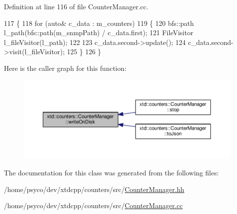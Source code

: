 Definition at line 116 of file Counter\+Manager.\+cc.


\begin{DoxyCode}
117 \{
118   \textcolor{keywordflow}{for} (\textcolor{keyword}{auto}& c\_data : m\_counters)
119   \{
120     bfs::path   l\_path(bfs::path(m\_snmpPath) / c\_data.first);
121     FileVisitor l\_fileVisitor(l\_path);
122 
123     c\_data.second->update();
124     c\_data.second->visit(l\_fileVisitor);
125   \}
126 \}
\end{DoxyCode}


Here is the caller graph for this function\+:
\nopagebreak
\begin{figure}[H]
\begin{center}
\leavevmode
\includegraphics[width=350pt]{classxtd_1_1counters_1_1CounterManager_a6b9bb7cbdc06c137d04d7a944232b264_icgraph}
\end{center}
\end{figure}




The documentation for this class was generated from the following files\+:\begin{DoxyCompactItemize}
\item 
/home/psyco/dev/xtdcpp/counters/src/\hyperlink{CounterManager_8hh}{Counter\+Manager.\+hh}\item 
/home/psyco/dev/xtdcpp/counters/src/\hyperlink{CounterManager_8cc}{Counter\+Manager.\+cc}\end{DoxyCompactItemize}
